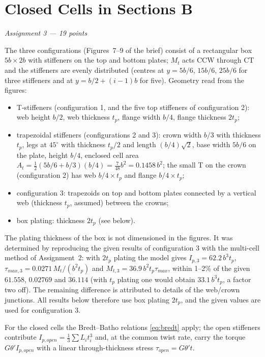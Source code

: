 \chapter{Closed Cells in Sections B}
\label{ch:assignment3}

\begingroup\itshape Assignment 3 --- 19 points\endgroup

\bigskip
The three configurations (Figures~7--9 of the brief) consist of a rectangular box $5b\times2b$ with stiffeners on the top and bottom plates; $M_t$ acts CCW through CT and the stiffeners are evenly distributed (centres at $y=5b/6$, $15b/6$, $25b/6$ for three stiffeners and at $y=b/2+(i-1)b$ for five). Geometry read from the figures:
\begin{itemize}
  \item T-stiffeners (configuration 1, and the five top stiffeners of configuration 2): web height $b/2$, web thickness $t_p$, flange width $b/4$, flange thickness $2t_p$;
  \item trapezoidal stiffeners (configurations 2 and 3): crown width $b/3$ with thickness $t_p$, legs at $45^\circ$ with thickness $t_p/2$ and length $(b/4)\sqrt2$, base width $5b/6$ on the plate, height $b/4$, enclosed cell area $A_t=\tfrac12(5b/6+b/3)(b/4)=\tfrac{7}{48}b^2=0.1458\,b^2$; the small T on the crown (configuration 2) has web $b/4\times t_p$ and flange $b/4\times t_p$;
  \item configuration 3: trapezoids on top and bottom plates connected by a vertical web (thickness $t_p$, assumed) between the crowns;
  \item box plating: thickness $2t_p$ (see below).
\end{itemize}
The plating thickness of the box is not dimensioned in the figures. It was determined by reproducing the given results of configuration 3 with the multi-cell method of Assignment~2: with $2t_p$ plating the model gives $I_{p,3}=62.2\,b^3t_p$, $\tau_{max,3}=0.0271\,M_t/(b^2t_p)$ and $M_{t,3}=36.9\,b^2t_p\tau_{max}$, within 1--2\% of the given $61.558$, $0.02769$ and $36.114$ (with $t_p$ plating one would obtain $33.1\,b^3t_p$, a factor two off). The remaining difference is attributed to details of the web/crown junctions. All results below therefore use box plating $2t_p$, and the given values are used for configuration 3.

For the closed cells the Bredt--Batho relations \eqref{eq:bredt} apply; the open stiffeners contribute $I_{p,open}=\frac13\sum L_it_i^3$ and, at the common twist rate, carry the torque $G\theta'I_{p,open}$ with a linear through-thickness stress $\tau_{open}=G\theta't$.

